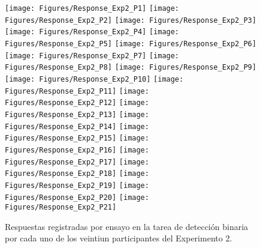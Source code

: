 \begin{figure}[th]
\centering
\texttt{[image: Figures/Response\_Exp2\_P1]} \texttt{[image: Figures/Response\_Exp2\_P2]} \texttt{[image: Figures/Response\_Exp2\_P3]}
\texttt{[image: Figures/Response\_Exp2\_P4]} \texttt{[image: Figures/Response\_Exp2\_P5]} \texttt{[image: Figures/Response\_Exp2\_P6]}
\texttt{[image: Figures/Response\_Exp2\_P7]} \texttt{[image: Figures/Response\_Exp2\_P8]} \texttt{[image: Figures/Response\_Exp2\_P9]}
\texttt{[image: Figures/Response\_Exp2\_P10]} \texttt{[image: Figures/Response\_Exp2\_P11]} \texttt{[image: Figures/Response\_Exp2\_P12]}
\texttt{[image: Figures/Response\_Exp2\_P13]} \texttt{[image: Figures/Response\_Exp2\_P14]} \texttt{[image: Figures/Response\_Exp2\_P15]}
\texttt{[image: Figures/Response\_Exp2\_P16]} \texttt{[image: Figures/Response\_Exp2\_P17]} \texttt{[image: Figures/Response\_Exp2\_P18]}
\texttt{[image: Figures/Response\_Exp2\_P19]} \texttt{[image: Figures/Response\_Exp2\_P20]} \texttt{[image: Figures/Response\_Exp2\_P21]} 
\caption[Respuesta binaria registrada ensayo a ensayo; Experimento 2]{Respuestas registradas por ensayo en la tarea de detección binaria por cada uno de los veintiun participantes del Experimento 2.}
\label{fig:Response_E2}
\end{figure}

